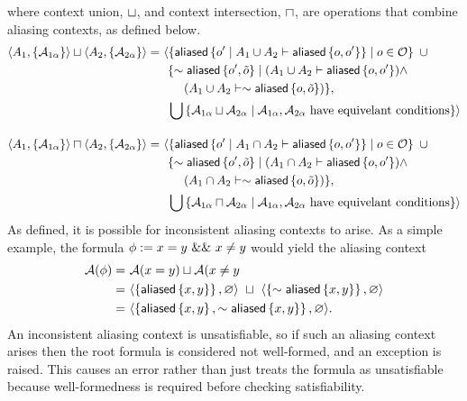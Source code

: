 %
where context union, $\sqcup$, and context intersection, $\sqcap$, are operations that combine aliasing contexts, as defined below.
%
\begin{align*}
\context{A_1}{\set{\A_{1\alpha}}} \contextunion \context{A_2}{\set{\A_{2\alpha}}} =& \
\langle
  \set{
    \aliased\set{ o\p \mid A_1 \cup A_2 \entails \aliased\set{o,o\p} }
    \mid
    o \in \O
  } \ \cup \\ & \ \
  \{
    \pnot \aliased\set{o\p, \tilde o}
    \mid
    (A_1 \cup A_2 \entails \aliased\set{o, o\p}) \land \\ & \hspace{2em}
    (A_1 \cup A_2 \entails \pnot \aliased\set{o, \tilde o})
  \}
, \\ & \ \
  \bigcup \set{ \A_{1\alpha} \contextunion \A_{2\alpha} \mid
  \A_{1\alpha}, \A_{2\alpha} \ \text{have equivelant conditions} }
\rangle
%
\\[1em]
%
\context{A_1}{\set{\A_{1\alpha}}} \contextintersection \context{A_2}{\set{\A_{2\alpha}}} =& \
\langle
  \set{
    \aliased\set{ o\p \mid A_1 \cap A_2 \entails \aliased\set{o,o\p} }
    \mid
    o \in \O
  } \ \cup \\ & \ \
  \{
    \pnot \aliased\set{o\p, \tilde o}
    \mid
    (A_1 \cap A_2 \entails \aliased\set{o, o\p}) \land \\ & \hspace{2em}
    (A_1 \cap A_2 \entails \pnot \aliased\set{o, \tilde o})
  \}
, \\ &  \ \
\bigcup \set{ \A_{1\alpha} \contextintersection \A_{2\alpha} \mid
\A_{1\alpha}, \A_{2\alpha} \ \text{have equivelant conditions} }
\rangle
\\
\end{align*}
As defined, it is possible for inconsistent aliasing contexts to arise. As a simple example, the formula $\phi := x = y \ \&\& \ x \neq y$ would yield the aliasing context
\begin{align*}
  \mathcal{A}(\phi) = & \
  \mathcal{A}(x = y) \sqcup \mathcal{A}(x \neq y \\ = & \
  \langle \left\{  \textsf{aliased}\left\{ x,y \right\}  \right\}, \varnothing \rangle \ \sqcup \
  \langle \left\{  \sim \textsf{aliased}\left\{ x,y \right\}  \right\}, \varnothing \rangle \\ = & \
  \langle \left\{  \textsf{aliased}\left\{ x,y \right\}, \sim \textsf{aliased}\left\{ x,y \right\}  \right\}, \varnothing \rangle.
\end{align*}
An inconsistent aliasing context is unsatisfiable, so if such an aliasing context arises then the root formula is considered not well-formed, and an  exception is raised. This causes an error rather than just treats the formula as unsatisfiable because well-formedness is required before checking satisfiability.
